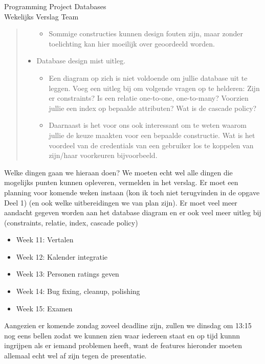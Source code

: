 \documentclass{article}
\newcounter{team}
\begin{document}
\begin{Minutes}{Programming Project Databases \\ Wekelijks Verslag Team }
\begin{quote}
\begin{itemize}
\begin{itemize}
                        \item Sommige constructies kunnen design fouten zijn, maar zonder toelichting kan hier moeilijk over geoordeeld worden.
                    \end{itemize}
                    \item Database design mist uitleg.
                    \begin{itemize}
                        \item Een diagram op zich is niet voldoende om jullie database uit te leggen. Voeg een uitleg bij om volgende vragen op te helderen: Zijn er constraints? Is een relatie one-to-one, one-to-many? Voorzien jullie een index op bepaalde attributen? Wat is de cascade policy?
                        \item Daarnaast is het voor ons ook interessant om te weten waarom jullie de keuze maakten voor een bepaalde constructie. Wat is het voordeel van de credentials van een gebruiker los te koppelen van zijn/haar voorkeuren bijvoorbeeld.
                        \end{itemize}
\end{itemize}
				    \end{quote}

				    Welke dingen gaan we hieraan doen? We moeten echt wel alle dingen die mogelijks punten kunnen opleveren, vermelden in het verslag. Er moet een planning voor komende weken instaan (kon ik toch niet terugvinden in de opgave Deel 1) (en ook welke uitbereidingen we van plan zijn).
				    Er moet veel meer aandacht gegeven worden aan het database diagram en er ook veel meer uitleg bij (constraints, relatie,  index, cascade policy)

				        \begin{itemize}
				            \item Week 11: Vertalen
				            \item Week 12: Kalender integratie
				            \item Week 13: Personen ratings geven
				            \item Week 14: Bug fixing, cleanup, polishing
				            \item Week 15: Examen
				        \end{itemize}

 		        Aangezien er komende zondag zoveel deadline zijn, zullen we dinsdag om 13:15 nog eens bellen zodat we kunnen zien waar iedereen staat en op tijd kunnn ingrijpen als er iemand problemen heeft, want de features hieronder moeten allemaal echt wel af zijn tegen de presentatie.


\end{Minutes}
\end{document}
